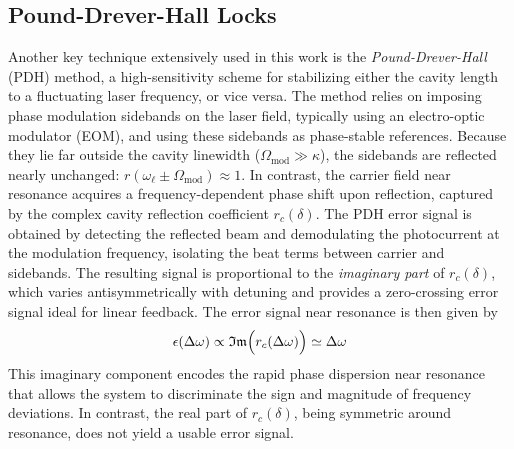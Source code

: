 \subsection{Pound-Drever-Hall Locks}
Another key technique extensively used in this work is the \textit{Pound-Drever-Hall} (PDH) method, a high-sensitivity scheme for stabilizing either the cavity length to a fluctuating laser frequency, or vice versa. The method relies on imposing phase modulation sidebands on the laser field, typically using an electro-optic modulator (EOM), and using these sidebands as phase-stable references. Because they lie far outside the cavity linewidth (\( \Omega_{\text{mod}} \gg \kappa \)), the sidebands are reflected nearly unchanged: \( r(\omega_\ell \pm \Omega_{\text{mod}}) \approx 1 \). In contrast, the carrier field near resonance acquires a frequency-dependent phase shift upon reflection, captured by the complex cavity reflection coefficient \( r_c(\delta) \). The PDH error signal is obtained by detecting the reflected beam and demodulating the photocurrent at the modulation frequency, isolating the beat terms between carrier and sidebands. The resulting signal is proportional to the \textit{imaginary part} of \( r_c(\delta) \), which varies antisymmetrically with detuning and provides a zero-crossing error signal ideal for linear feedback. The error signal near resonance is then given by 
\begin{equation}
\epsilon(\Delta \omega) \propto \mathfrak{Im} \Bigl(r_c(\Delta \omega)\Bigr)\simeq \Delta \omega
\end{equation}
This imaginary component encodes the rapid phase dispersion near resonance that allows the system to discriminate the sign and magnitude of frequency deviations. In contrast, the real part of \( r_c(\delta) \), being symmetric around resonance, does not yield a usable error signal. \newline

